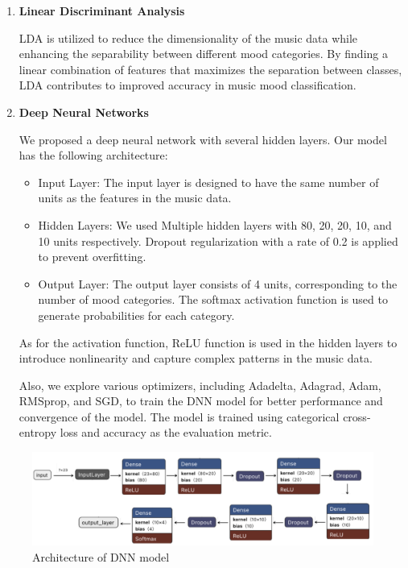 \documentclass{article}
\begin{document}
\begin{enumerate}
  \item \textbf{Linear Discriminant Analysis}
  
  LDA is utilized to reduce the dimensionality of the music data while enhancing the separability between different mood categories. By finding a linear combination of features that maximizes the separation between classes, LDA contributes to improved accuracy in music mood classification.

  \item \textbf{Deep Neural Networks}
  
  We proposed a deep neural network with several hidden layers.  Our model has the following architecture: 
  \begin{itemize}
  \item Input Layer: The input layer is designed to have the same number of units as the features in the music data.

  \item  Hidden Layers: We used Multiple hidden layers with 80, 20, 20, 10, and 10 units respectively. Dropout regularization with a rate of 0.2 is applied to prevent overfitting.

  \item Output Layer: The output layer consists of 4 units, corresponding to the number of mood categories. The softmax activation function is used to generate probabilities for each category.
  \end{itemize}

  As for the activation function, ReLU function is used in the hidden layers to introduce nonlinearity and capture complex patterns in the music data.

  Also, we explore various optimizers, including Adadelta, Adagrad, Adam, RMSprop, and SGD, to train the DNN model for better performance and convergence of the model. The model is trained using categorical cross-entropy loss and accuracy as the evaluation metric.


\end{enumerate}
\begin{figure}[!htbp]
\centering
\includegraphics[scale=0.5]{model.png}
\caption{Architecture of DNN model}
\end{figure}
\end{document}
